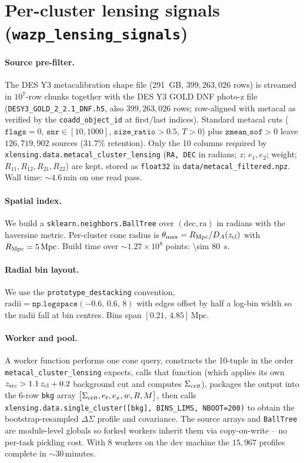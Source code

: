 \documentclass[11pt,a4paper]{article}
\newcommand{\DS}{\Delta\Sigma}
\newcommand{\Mpc}{\,\mathrm{Mpc}}
\begin{document}
\section{Per-cluster lensing signals (\texttt{wazp\_lensing\_signals})}
\label{sec:percluster}

\paragraph{Source pre-filter.} The DES Y3 metacalibration shape file
(\SI{291}{GB}, $399{,}263{,}026$ rows) is streamed in $10^7$-row chunks
together with the DES Y3 GOLD DNF photo-z file
(\verb|DESY3_GOLD_2_2.1_DNF.h5|, also $399{,}263{,}026$ rows; row-aligned
with metacal as verified by the \verb|coadd_object_id| at first/last
indices). Standard metacal cuts
($\texttt{flags}=0$, $\texttt{snr}\in[10,1000]$,
$\texttt{size\_ratio}>0.5$, $T>0$) plus $\texttt{zmean\_sof}>0$ leave
$126{,}719{,}902$ sources ($31.7\%$ retention). Only the 10 columns
required by \verb|xlensing.data.metacal_cluster_lensing|
(\verb|RA, DEC| in radians; $z$; $e_1, e_2$; weight; $R_{11}, R_{12}, R_{21},
R_{22}$) are kept, stored as \verb|float32| in \verb|data/metacal_filtered.npz|.
Wall time: $\sim 4.6\,\mathrm{min}$ on one read pass.

\paragraph{Spatial index.} We build a \verb|sklearn.neighbors.BallTree| over
$(\mathrm{dec}, \mathrm{ra})$ in radians with the haversine metric. Per-cluster
cone radius is $\theta_{\max} = R_{\rm Mpc}/D_A(z_{\rm cl})$ with
$R_{\rm Mpc}=5\Mpc$. Build time over $\sim 1.27 \times 10^8$ points:
\SI{\sim 80}{\second}.

\paragraph{Radial bin layout.} We use the
\verb|prototype_destacking| convention,
$\mathrm{radii} = \texttt{np.logspace}(-0.6,\,0.6,\,8)$ with edges offset by
half a log-bin width so the radii fall at bin centres. Bins span
$[0.21,\,4.85]\Mpc$.

\paragraph{Worker and pool.} A worker function performs one cone query,
constructs the 10-tuple in the order
\verb|metacal_cluster_lensing| expects, calls that function (which applies its
own $z_{\rm src}>1.1\,z_{\rm cl}+0.2$ background cut and computes
$\Sigma_{\rm crit}$), packages the output into the 6-row \verb|bkg| array
$\bigl[\Sigma_{\rm crit}, e_t, e_x, w, R, M\bigr]$, then calls
\verb|xlensing.data.single_cluster([bkg], BINS_LIMS, NBOOT=200)| to obtain
the bootstrap-resampled $\DS$ profile and covariance. The source arrays and
\verb|BallTree| are module-level globals so forked workers inherit them via
copy-on-write -- no per-task pickling cost. With $8$ workers on the dev
machine the $15{,}967$ profiles complete in $\sim 30$\,minutes.
\end{document}
